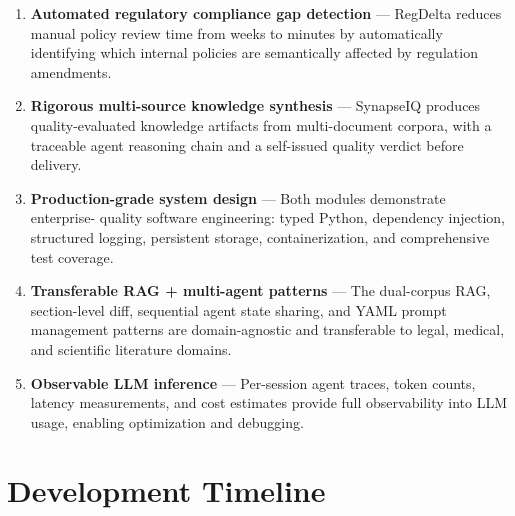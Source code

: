 \documentclass[12pt,letterpaper]{article}
\begin{document}
\begin{enumerate}[leftmargin=2em]
  \item \textbf{Automated regulatory compliance gap detection} --- RegDelta reduces manual
        policy review time from weeks to minutes by automatically identifying which internal
        policies are semantically affected by regulation amendments.

  \item \textbf{Rigorous multi-source knowledge synthesis} --- SynapseIQ produces
        quality-evaluated knowledge artifacts from multi-document corpora, with a traceable
        agent reasoning chain and a self-issued quality verdict before delivery.

  \item \textbf{Production-grade system design} --- Both modules demonstrate enterprise-
        quality software engineering: typed Python, dependency injection, structured logging,
        persistent storage, containerization, and comprehensive test coverage.

  \item \textbf{Transferable RAG + multi-agent patterns} --- The dual-corpus RAG,
        section-level diff, sequential agent state sharing, and YAML prompt management
        patterns are domain-agnostic and transferable to legal, medical, and scientific
        literature domains.

  \item \textbf{Observable LLM inference} --- Per-session agent traces, token counts,
        latency measurements, and cost estimates provide full observability into LLM usage,
        enabling optimization and debugging.
\end{enumerate}

\section{Development Timeline}
\end{document}
